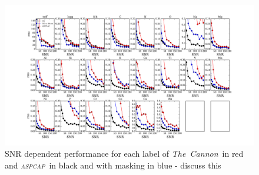 \documentclass[14pt, preprint2]{aastex6}
\newcommand{\project}[1]{\textsl{#1}}
\newcommand{\tc}{\project{The~Cannon}}
\newcommand{\aspcap}{\project{\textsc{aspcap}}}
\begin{document}

\begin{figure}[h!]
\includegraphics[scale=0.45]{rms_snr_both_dr132.pdf} 
  \caption{SNR dependent performance for each label of \tc\ in red and \aspcap\ in black and with masking in blue - discuss this}
\label{fig:snr_error}
\end{figure}


\end{document}
